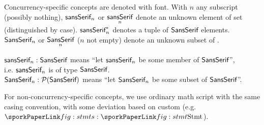 
Concurrency-specific concepts are denoted with  font.
With $n$ any subscript (possibly nothing), $\textsf{sansSerif}_n$ or $\underset{n}{\textsf{sansSerif}}$ denote an unknown element of set  (distinguished by case).
$\textsf{sansSerif}_n^*$ denotes a tuple of $\textsf{SansSerif}$ elements.
$\textsf{SansSerif}_n$ or $\underset{n}{\textsf{SansSerif}}$ ($n$ not empty) denote an unknown subset of .

$\textsf{sansSerif}_n:\textsf{SansSerif}$ means ``let $\textsf{sansSerif}_n$ be some member of $\textsf{SansSerif}$'',\\
i.e. $\textsf{sansSerif}_n$ is of type $\textsf{SansSerif}$.\\
$\textsf{SansSerif}_n:\mathcal{P}(\textsf{SansSerif})$ means ``let $\textsf{SansSerif}_n$ be some subset of $\textsf{SansSerif}$''.

For non-concurrency-specific concepts, we use ordinary math script with the same casing convention, with some deviation based on custom (e.g. $\sporks{}: \sporkStmt{}$).
